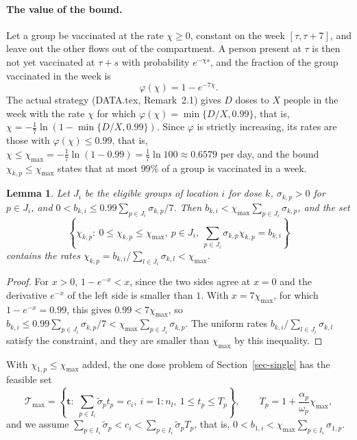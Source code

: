 \documentclass[11pt]{article}
\theoremstyle{plain}
\newtheorem{lemma}[theorem]{Lemma}
\theoremstyle{remark}
\numberwithin{equation}{section}
\begin{document}
\paragraph{The value of the bound.} Let a group be vaccinated at the rate $\chi\ge0$,
constant on the week $[\tau,\tau+7]$, and leave out the other flows out of the
compartment. A person present at $\tau$ is then not yet vaccinated at $\tau+s$ with
probability $e^{-\chi s}$, and the fraction of the group vaccinated in the week is
\begin{equation}\label{phi-week}
\varphi(\chi)=1-e^{-7\chi}.
\end{equation}
The actual strategy (DATA.tex, Remark~2.1) gives $D$ doses to $X$ people in the week
with the rate $\chi$ for which $\varphi(\chi)=\min\{D/X,0.99\}$, that is,
$\chi=-\frac17\ln\left(1-\min\{D/X,0.99\}\right)$. Since $\varphi$ is strictly
increasing, its rates are those with $\varphi(\chi)\le0.99$, that is,
$\chi\le\chi_{\max}=-\frac17\ln(1-0.99)=\frac17\ln100\approx0.6579$ per day, and the
bound $\chi_{k,p}\le\chi_{\max}$ states that at most $99\%$ of a group is vaccinated
in a week.

\begin{lemma}\label{lem-bound-feasible}
Let $J_i$ be the eligible groups of location $i$ for dose $k$, $\sigma_{k,p}>0$ for
$p\in J_i$, and $0<b_{k,i}\le0.99\sum_{p\in J_i}\sigma_{k,p}/7$. Then
$b_{k,i}<\chi_{\max}\sum_{p\in J_i}\sigma_{k,p}$, and the set
\begin{equation*}
\left\{\chi_{k,p}:\ 0\le\chi_{k,p}\le\chi_{\max},\ p\in J_i,\
\sum_{p\in J_i}\sigma_{k,p}\chi_{k,p}=b_{k,i}\right\}
\end{equation*}
contains the rates $\chi_{k,p}=b_{k,i}/\sum_{l\in J_i}\sigma_{k,l}<\chi_{\max}$.
\end{lemma}
\begin{proof}
For $x>0$, $1-e^{-x}<x$, since the two sides agree at $x=0$ and the derivative
$e^{-x}$ of the left side is smaller than $1$. With $x=7\chi_{\max}$, for which
$1-e^{-x}=0.99$, this gives $0.99<7\chi_{\max}$, so
$b_{k,i}\le0.99\sum_{p\in J_i}\sigma_{k,p}/7<\chi_{\max}\sum_{p\in J_i}\sigma_{k,p}$.
The uniform rates $b_{k,i}/\sum_{l\in J_i}\sigma_{k,l}$ satisfy the constraint, and
they are smaller than $\chi_{\max}$ by this inequality.
\end{proof}

With $\chi_{1,p}\le\chi_{\max}$ added, the one dose problem of
Section~\ref{sec-single} has the feasible set
\begin{equation*}
\mathcal T_{\max}=\left\{\bm t:\ \sum_{p\in I_i}\widetilde\sigma_pt_p=c_i,\ i=1:n_l,\
1\le t_p\le T_p\right\},\qquad T_p=1+\frac{\alpha_p}{\omega_p}\chi_{\max},
\end{equation*}
and we assume $\sum_{p\in I_i}\widetilde\sigma_p<c_i<\sum_{p\in I_i}\widetilde\sigma_pT_p$,
that is, $0<b_{1,i}<\chi_{\max}\sum_{p\in I_i}\sigma_{1,p}$.
\end{document}
